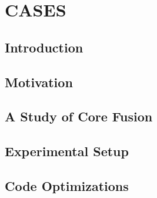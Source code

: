 \newcommand{\bm}[1]{\textit{#1}}
\setlength{\textfloatsep}{0.1cm}

\chapter{CASES}


\section{Introduction}\label{sect:introduction}


%

\vspace{-2mm}
\section{Motivation}\label{sec:motivation}


\section{A Study of Core Fusion}\label{sec:lim_study}


\section{Experimental Setup}\label{sec:setup}


\section{Code Optimizations}\label{sec:opt}


